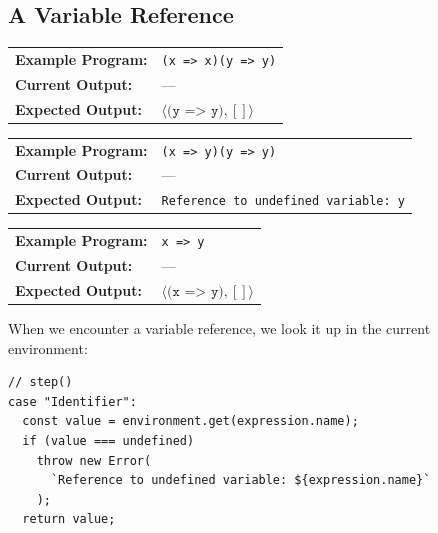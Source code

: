 \documentclass[12pt, oneside]{book}
\begin{document}
\subsection{A Variable Reference}

\begin{center}
\begin{tabular}{ll}
\textbf{Example Program:} & \texttt{(x => x)(y => y)} \\
\textbf{Current Output:} & — \\
\textbf{Expected Output:} & $\langle \texttt{(y => y)}, [] \rangle$ \\
\end{tabular}
\end{center}

\begin{center}
\begin{tabular}{ll}
\textbf{Example Program:} & \texttt{(x => y)(y => y)} \\
\textbf{Current Output:} & — \\
\textbf{Expected Output:} & \texttt{Reference to undefined variable: y} \\
\end{tabular}
\end{center}

\begin{center}
\begin{tabular}{ll}
\textbf{Example Program:} & \texttt{x => y} \\
\textbf{Current Output:} & — \\
\textbf{Expected Output:} & $\langle \texttt{(x => y)}, [] \rangle$ \\
\end{tabular}
\end{center}

When we encounter a variable reference, we look it up in the current environment:

\begin{verbatim}
// step()
case "Identifier":
  const value = environment.get(expression.name);
  if (value === undefined)
    throw new Error(
      `Reference to undefined variable: ${expression.name}`
    );
  return value;
\end{verbatim}





\backmatter




\end{document}

